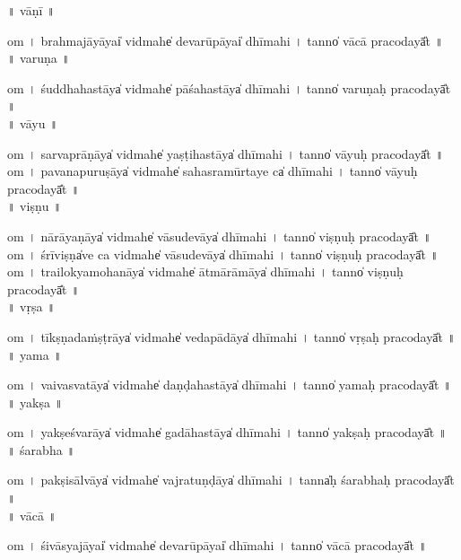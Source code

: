 \documentclass[parskip, DIV=14]{scrartcl}
\begin{document}
\vspace{0.201cm} ॥   vāṇī  ॥ \par
  om  । bra॒hma॒jā॒yāyai̍ vi॒dmahe̍ devarū॒pāyai̍ dhīmahi  ।  tanno̍ vācā praco॒dayā̎t ॥ \\

\vspace{0.201cm} ॥   varuṇa  ॥ \par
  om  । śu॒ddha॒ha॒stāya̍ vi॒dmahe̍ pāśaha॒stāya̍ dhīmahi  ।  tanno̍ varuṇaḥ praco॒dayā̎t ॥ \\

\vspace{0.201cm} ॥   vāyu  ॥ \par
  om  । sa॒rva॒prā॒ṇāya̍ vi॒dmahe̍ yaṣṭiha॒stāya̍ dhīmahi  ।  tanno̍ vāyuḥ praco॒dayā̎t ॥ \\
  om  । pa॒va॒na॒pu॒ru॒ṣāya̍ vi॒dmahe̍ sahasramūrta॒ye ca̍ dhīmahi  ।  tanno̍ vāyuḥ praco॒dayā̎t ॥ \\

\vspace{0.201cm} ॥   viṣṇu  ॥ \par
  om  । nā॒rā॒ya॒ṇāya̍ vi॒dmahe̍ vāsude॒vāya̍ dhīmahi  ।  tanno̍ viṣṇuḥ praco॒dayā̎t ॥ \\
  om  । śrīviṣṇa̍ve ca vi॒dmahe̍ vāsude॒vāya̍ dhīmahi  ।  tanno̍ viṣṇuḥ praco॒dayā̎t ॥ \\
  om  । trai॒lo॒kya॒mo॒ha॒nāya̍ vi॒dmahe̍ ātmārā॒māya̍ dhīmahi  ।  tanno̍ viṣṇuḥ praco॒dayā̎t ॥ \\

\vspace{0.201cm} ॥   vṛṣa  ॥ \par
  om  । tī॒kṣṇa॒da॒ṁṣṭrāya̍ vi॒dmahe̍ vedapā॒dāya̍ dhīmahi  ।  tanno̍ vṛṣaḥ praco॒dayā̎t ॥ \\

\vspace{0.201cm} ॥   yama  ॥ \par
  om  । vai॒va॒sva॒tāya̍ vi॒dmahe̍ daṇḍaha॒stāya̍ dhīmahi  ।  tanno̍ yamaḥ praco॒dayā̎t ॥ \\

\vspace{0.201cm} ॥   yakṣa  ॥ \par
  om  । ya॒kṣe॒śva॒rāya̍ vi॒dmahe̍ gadāha॒stāya̍ dhīmahi  ।  tanno̍ yakṣaḥ praco॒dayā̎t ॥ \\

\vspace{0.201cm} ॥   śarabha  ॥ \par
  om  । pa॒kṣi॒sā॒lvāya̍ vi॒dmahe̍ vajratu॒ṇḍāya̍ dhīmahi  ।  tanna̍ḥ śarabhaḥ praco॒dayā̎t ॥ \\

\vspace{0.201cm} ॥   vācā  ॥ \par
  om  । śi॒vā॒sya॒jāyai̍ vi॒dmahe̍ devarū॒pāyai̍ dhīmahi  ।  tanno̍ vācā praco॒dayā̎t ॥ \\
\end{document}
